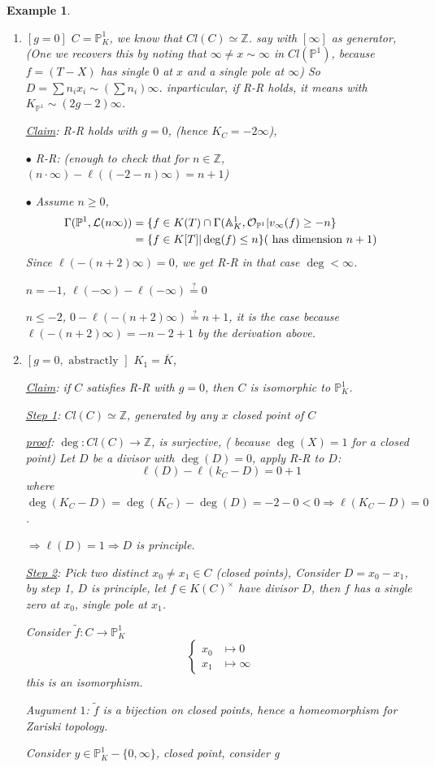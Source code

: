 \documentclass[11pt]{article}
\newtheorem{ex}[thm]{Example}
\newcommand{\affn}{\mathbb A}
\newcommand{\proj}{\mathbb P}
\newcommand{\intg}{\mathbb Z}
\newcommand{\call}{{\cal L}}
\newcommand{\calo}{{\cal O}}
\newcommand{\Lrta}{\Longrightarrow}
\newcommand{\lrta}{\longrightarrow}
\begin{document}
 \begin{ex}
 \begin{enumerate}[label=(\arabic*)]
\item $[g=0]$ $C=\proj^1_K$, we know that $Cl(C)\simeq  \intg$. say with $[\infty]$ as generator, (One we recovers this by noting that $\infty \neq x\sim \infty$ in $Cl(\proj^1)$, because $f=(T-X)$ has single $0$ at $x$ and a single pole at $\infty$)
So $D=\sum n_i x_i\sim (\sum n_i)\infty$.  inparticular, if R-R holds, it means with $K_{\proj^1}\sim (2g-2)\infty$.

\underline{Claim}: R-R holds with $g=0$, (hence $K_C=-2\infty$),

$\bullet$ R-R: (enough to check that for $n\in \intg$, $(n\cdot \infty)-\ell((-2-n)\infty)=n+1$)

$\bullet$ Assume $n\geq 0$,
$$
\begin{aligned}
\Gamma(\proj^1,\call(n\infty))&=\{f\in K(T)\cap \Gamma(\affn^1_K,\calo_{\proj^1}|v_{\infty}(f)\geq -n\}\\
&=\{f\in K[T]|\deg(f)\leq n\} (\text{ has dimension $n+1$})
\end{aligned}
$$
Since $\ell(-(n+2)\infty)=0$, we get R-R in that case $\deg< \infty$.

$n=-1$, $\ell(-\infty)-\ell(-\infty)\overset{?}{=}0$

$n\leq -2$, $0-\ell(-(n+2)\infty)\overset{?}{=}n+1$, it is the case because $\ell(-(n+2)\infty)=-n-2+1$ by the derivation above.
\item $[g=0,\text{ abstractly }]$ $K_1=\overline{K}$, 

\underline{Claim}: if $C$ satisfies R-R with $g=0$, then $C$ is isomorphic to $\proj^1_K$.

\underline{Step 1}: $Cl(C)\simeq \intg$, generated by any $x$ closed point of $C$

\underline{proof}: $\deg: Cl(C)\lrta \intg$, is surjective, ( because $\deg(X)=1$ for a closed point) Let $D$ be a divisor with $\deg(D)=0$, apply R-R
 to $D$:
 $$
\ell(D)-\ell(k_C-D)=0+1
 $$
 where $\deg(K_C-D)=\deg(K_C)-\deg(D)=-2-0< 0\Lrta \ell(K_C-D)=0$.

 $\Lrta \ell(D)=1\Lrta D$ is principle.

 \underline{Step 2}: Pick two distinct $x_0\neq x_1\in C$ (closed points), Consider $D=x_0-x_1$, by step 1, $D$ is principle, let $f\in K(C)^\times$ have divisor $D$, then $f$ has a single zero at $x_0$, single pole at $x_1$.

Consider $\tilde{f}: C\lrta \proj^1_K$
$$
\left\{
\begin{aligned}
x_0&\longmapsto 0\\
x_1&\longmapsto \infty
\end{aligned}
\right.
$$
this is an isomorphism.

Augument $1$: $\tilde{f}$ is a bijection on closed points, hence a  homeomorphism for Zariski topology.

Consider $y\in \proj^1_K-\{0,\infty\}$, closed point, consider g

 \end{enumerate}
 \end{ex}
\end{document}
